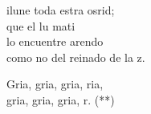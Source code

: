 \begin{cancion}
	ilune toda estra osrid; \\
	que el lu mati\\
	lo encuentre arendo\\
	como no del reinado de la z.\\
	\begin{chorus}%
	Gria, gria, gria, ria,\\
	gria, gria, gria, r. (**)\\
	\end{chorus}%
\end{cancion}%
